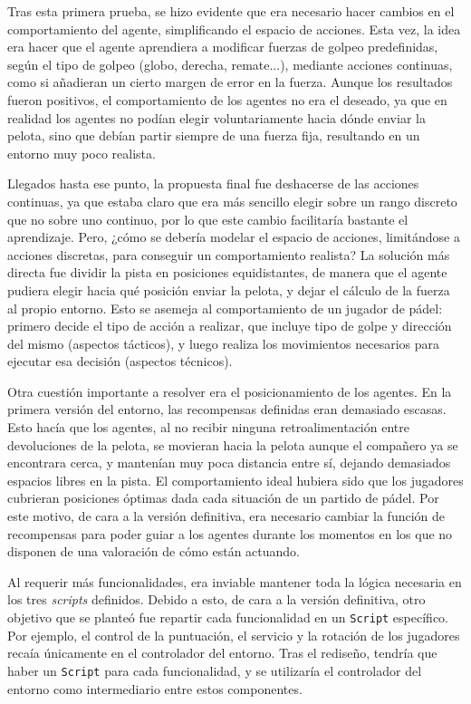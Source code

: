 \newpage

Tras esta primera prueba, se hizo evidente que era necesario hacer cambios en el comportamiento del agente, simplificando el espacio de acciones. Esta vez, la idea era hacer que el agente aprendiera a modificar fuerzas de golpeo predefinidas, según el tipo de golpeo (globo, derecha, remate...), mediante acciones continuas, como si añadieran un cierto margen de error en la fuerza. Aunque los resultados fueron positivos, el comportamiento de los agentes no era el deseado, ya que en realidad los agentes no podían elegir voluntariamente hacia dónde enviar la pelota, sino que debían partir siempre de una fuerza fija, resultando en un entorno muy poco realista.

Llegados hasta ese punto, la propuesta final fue deshacerse de las acciones continuas, ya que estaba claro que era más sencillo elegir sobre un rango discreto que no sobre uno continuo, por lo que este cambio facilitaría bastante el aprendizaje. Pero, ¿cómo se debería modelar el espacio de acciones, limitándose a acciones discretas, para conseguir un comportamiento realista? La solución más directa fue dividir la pista en posiciones equidistantes, de manera que el agente pudiera elegir hacia qué posición enviar la pelota, y dejar el cálculo de la fuerza al propio entorno. Esto se asemeja al comportamiento de un jugador de pádel: primero decide el tipo de acción a realizar, que incluye tipo de golpe y dirección del mismo (aspectos tácticos), y luego realiza los movimientos necesarios para ejecutar esa decisión (aspectos técnicos).

Otra cuestión importante a resolver era el posicionamiento de los agentes. En la primera versión del entorno, las recompensas definidas eran demasiado escasas. Esto hacía que los agentes, al no recibir ninguna retroalimentación entre devoluciones de la pelota, se movieran hacia la pelota aunque el compañero ya se encontrara cerca, y mantenían muy poca distancia entre sí, dejando demasiados espacios libres en la pista. El comportamiento ideal hubiera sido que los jugadores cubrieran posiciones óptimas dada cada situación de un partido de pádel. Por este motivo, de cara a la versión definitiva, era necesario cambiar la función de recompensas para poder guiar a los agentes durante los momentos en los que no disponen de una valoración de cómo están actuando.

Al requerir más funcionalidades, era inviable mantener toda la lógica necesaria en los tres \emph{scripts} definidos. Debido a esto, de cara a la versión definitiva, otro objetivo que se planteó fue repartir cada funcionalidad en un \texttt{Script} específico. Por ejemplo, el control de la puntuación, el servicio y la rotación de los jugadores recaía únicamente en el controlador del entorno. Tras el rediseño, tendría que haber un \texttt{Script} para cada funcionalidad, y se utilizaría el controlador del entorno como intermediario entre estos componentes.


